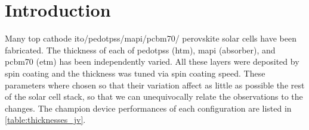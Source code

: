 
\section{Introduction}
	Many top cathode \gls{ito}\-/\gls{pedotpss}\-/\gls{mapi}\-/\gls{pcbm70}\-/ perovskite solar cells have been fabricated.
	The thickness of each of \gls{pedotpss} (\gls{htm}), \gls{mapi} (absorber), and \gls{pcbm70} (\gls{etm}) has been independently varied.
	All these layers were deposited by spin coating and the thickness was tuned via spin coating speed.
	These parameters where chosen so that their variation affect as little as possible the rest of the solar cell stack, so that we can unequivocally relate the observations to the changes.
	The champion device performances of each configuration are listed in \cref{table:thicknesses_jv}.

